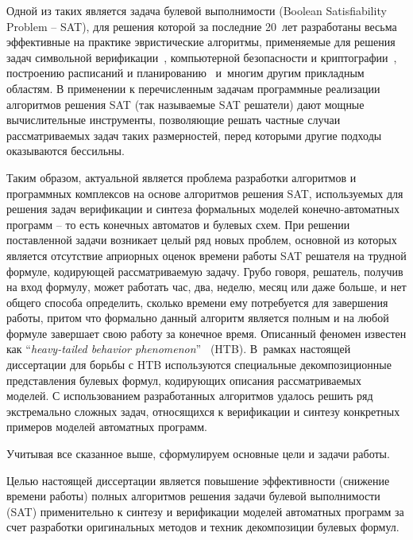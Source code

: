 Одной из таких является задача булевой выполнимости (Boolean Satisfiability Problem \--- SAT), для решения которой за последние 20~лет разработаны весьма эффективные на практике эвристические алгоритмы, применяемые для решения задач символьной верификации~\autocite{kroening2021}, компьютерной безопасности и криптографии~\autocite{bard2009}, построению расписаний и планированию~\autocite{prestwich2021} и~многим другим прикладным областям.
В применении к перечисленным задачам программные реализации алгоритмов решения SAT (так называемые SAT решатели) дают мощные вычислительные инструменты, позволяющие решать частные случаи рассматриваемых задач таких размерностей, перед которыми другие подходы оказываются бессильны.

Таким образом, актуальной является проблема разработки алгоритмов и программных комплексов на основе алгоритмов решения SAT, используемых для решения задач верификации и синтеза формальных моделей конечно-автоматных программ \--- то есть конечных автоматов и булевых схем.
При решении поставленной задачи возникает целый ряд новых проблем, основной из которых является отсутствие априорных оценок времени работы SAT решателя на трудной формуле, кодирующей рассматриваемую задачу.
Грубо говоря, решатель, получив на вход формулу, может работать час, два, неделю, месяц или даже больше, и нет общего способа определить, сколько времени ему потребуется для завершения работы, притом что формально данный алгоритм является полным и на любой формуле завершает свою работу за конечное время.
Описанный феномен известен как \enquote{\textit{heavy-tailed behavior phenomenon}}~\autocite{gomes2009} (HTB).
В~рамках настоящей диссертации для борьбы с HTB используются специальные декомпозиционные представления булевых формул, кодирующих описания рассматриваемых моделей.
С использованием разработанных алгоритмов удалось решить ряд экстремально сложных задач, относящихся к верификации и синтезу конкретных примеров моделей автоматных программ.

Учитывая все сказанное выше, сформулируем основные цели и задачи работы.


\aim
%
Целью настоящей диссертации является повышение эффективности (снижение времени работы) полных алгоритмов решения задачи булевой выполнимости (SAT) применительно к синтезу и верификации моделей автоматных программ за счет разработки оригинальных методов и техник декомпозиции булевых формул.


